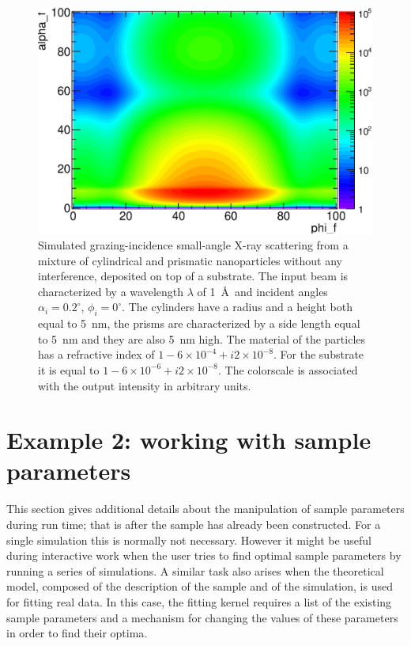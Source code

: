 \begin{figure}[htbp]
  \begin{center}
   \includegraphics[clip=true, width=120mm]{Figures/Manual_ex1.eps}
  \end{center}
  \caption[Example 1: Simulated grazing-incidence small-angle X-ray scattering from a mixture of
cylindrical and prismatic nanoparticles without any interference, deposited on top
of a substrate]{Simulated grazing-incidence small-angle X-ray scattering from a mixture of
cylindrical and prismatic nanoparticles without any interference, deposited on top
of a substrate. The input beam is characterized by a wavelength
$\lambda$ of 1~\AA\ and incident angles $\alpha_i=0.2^{\circ}$, $\phi_i=0^{\circ}$. The
cylinders have a radius and a height both equal to 5~nm, the prisms
are characterized by a side length equal to 5~nm and they are also 5~nm high. The
material of the particles has a refractive index of $1-6\times 10^{-4}+i2\times 10^{-8}$. For the substrate
it is equal to $1-6\times 10^{-6} +i2\times 10^{-8} $. The colorscale
is associated with the output intensity in arbitrary units. }
\label{fig:output_ex1}
\end{figure}



%
\section{Example 2: working with sample parameters} 

This section gives additional details about the manipulation of sample parameters
during run time; that is after the sample has already been constructed. 
For a single simulation this is normally not necessary. However it might be useful
during interactive work when the user tries to find optimal sample parameters by
running a series of simulations.
A similar task also arises when the theoretical model, composed of the
description of the sample and of the simulation, is used for fitting real data.
In this case, the fitting kernel requires a list of the existing sample parameters
and a mechanism for changing the values of these parameters in order to find 
their optima.

